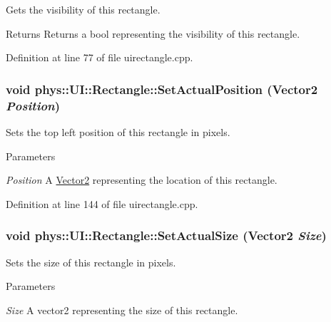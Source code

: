 Gets the visibility of this rectangle. 

\begin{DoxyReturn}{Returns}
Returns a bool representing the visibility of this rectangle. 
\end{DoxyReturn}


Definition at line 77 of file uirectangle.cpp.

\hypertarget{classphys_1_1UI_1_1Rectangle_a77fdf1fc5f2a2d73ccfb0ac0ff125ca5}{
\subsubsection[{SetActualPosition}]{\setlength{\rightskip}{0pt plus 5cm}void phys::UI::Rectangle::SetActualPosition ({\bf Vector2} {\em Position})}}
\label{d1/d5d/classphys_1_1UI_1_1Rectangle_a77fdf1fc5f2a2d73ccfb0ac0ff125ca5}


Sets the top left position of this rectangle in pixels. 


\begin{DoxyParams}{Parameters}
\item[{\em Position}]A \hyperlink{classphys_1_1Vector2}{Vector2} representing the location of this rectangle. \end{DoxyParams}


Definition at line 144 of file uirectangle.cpp.

\hypertarget{classphys_1_1UI_1_1Rectangle_acf993ac61f8f5707a4fb139d5ff6fd2e}{
\subsubsection[{SetActualSize}]{\setlength{\rightskip}{0pt plus 5cm}void phys::UI::Rectangle::SetActualSize ({\bf Vector2} {\em Size})}}
\label{d1/d5d/classphys_1_1UI_1_1Rectangle_acf993ac61f8f5707a4fb139d5ff6fd2e}


Sets the size of this rectangle in pixels. 


\begin{DoxyParams}{Parameters}
\item[{\em Size}]A vector2 representing the size of this rectangle. \end{DoxyParams}



